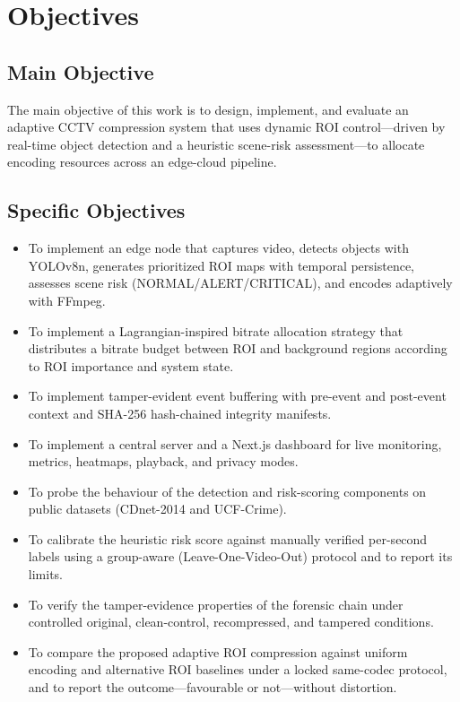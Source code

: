 \section{Objectives}

\subsection{Main Objective}

The main objective of this work is to design, implement, and evaluate an adaptive CCTV compression system that uses dynamic ROI control---driven by real-time object detection and a heuristic scene-risk assessment---to allocate encoding resources across an edge-cloud pipeline.

\subsection{Specific Objectives}

\begin{itemize}
\item To implement an edge node that captures video, detects objects with YOLOv8n, generates prioritized ROI maps with temporal persistence, assesses scene risk (NORMAL/ALERT/CRITICAL), and encodes adaptively with FFmpeg.
\item To implement a Lagrangian-inspired bitrate allocation strategy that distributes a bitrate budget between ROI and background regions according to ROI importance and system state.
\item To implement tamper-evident event buffering with pre-event and post-event context and SHA-256 hash-chained integrity manifests.
\item To implement a central server and a Next.js dashboard for live monitoring, metrics, heatmaps, playback, and privacy modes.
\item To probe the behaviour of the detection and risk-scoring components on public datasets (CDnet-2014 and UCF-Crime).
\item To calibrate the heuristic risk score against manually verified per-second labels using a group-aware (Leave-One-Video-Out) protocol and to report its limits.
\item To verify the tamper-evidence properties of the forensic chain under controlled original, clean-control, recompressed, and tampered conditions.
\item To compare the proposed adaptive ROI compression against uniform encoding and alternative ROI baselines under a locked same-codec protocol, and to report the outcome---favourable or not---without distortion.
\end{itemize}

